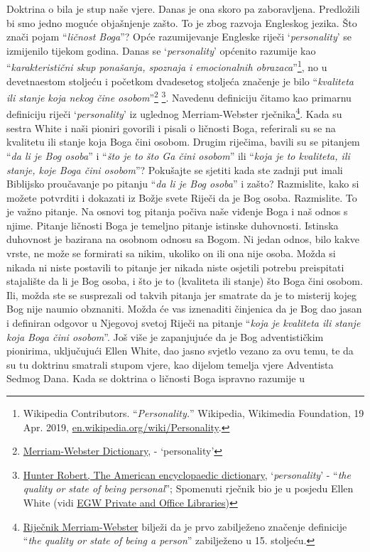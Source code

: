Doktrina o  bila je stup naše vjere. Danas je ona skoro pa zaboravljena. Predložili bi smo jedno moguće objašnjenje zašto. To je zbog razvoja Engleskog jezika. Što znači pojam “\textit{ličnost Boga}”? Opće razumijevanje Engleske riječi ‘\textit{personality}’ se izmijenilo tijekom godina. Danas se ‘\textit{personality}’ općenito razumije kao “\textit{karakteristični skup ponašanja, spoznaja i emocionalnih obrazaca}”\footnote{Wikipedia Contributors. “\textit{Personality.}” Wikipedia, Wikimedia Foundation, 19 Apr. 2019, \href{https://en.wikipedia.org/wiki/Personality}{en.wikipedia.org/wiki/Personality}.}, no u devetnaestom stoljeću i početkom dvadesetog stoljeća značenje je bilo “\textit{kvaliteta ili stanje koja nekog čine osobom}”\footnote{\href{https://www.merriam-webster.com/dictionary/personality}{Merriam-Webster Dictionary}, - ‘personality’} \footnote{\href{https://babel.hathitrust.org/cgi/pt?id=mdp.39015050663213&view=1up&seq=780}{Hunter Robert, The American encyclopaedic dictionary}, ‘\textit{personality}’ - “\textit{the quality or state of being personal}”; Spomenuti rječnik bio je u posjedu Ellen White (vidi \href{https://repo.adventistdigitallibrary.org/PDFs/adl-22/adl-22251050.pdf?_ga=2.116010630.1065317374.1621993520-1506151612.1617862694&fbclid=IwAR3vwmp8jxtnpPEKv0KD9mCv8dJpmRGoyIXW0CkbQAjbU0h6YaBGqhgBzbk}{EGW Private and Office Libraries})}. Navedenu definiciju čitamo kao primarnu definiciju riječi ‘\textit{personality}’ iz uglednog Merriam-Webster rječnika\footnote{\href{https://www.merriam-webster.com/dictionary/personality\#word-history}{Riječnik Merriam-Webster} bilježi da je prvo zabilježeno značenje definicije “\textit{the quality or state of being a person}” zabilježeno u 15. stoljeću.}. Kada su sestra White i naši pioniri govorili i pisali o ličnosti Boga, referirali su se na kvalitetu ili stanje koja Boga čini osobom. Drugim riječima, bavili su se pitanjem “\textit{da li je Bog osoba}” i “\textit{što je to što Ga čini osobom}” ili “\textit{koja je to kvaliteta, ili stanje, koje Boga čini osobom}”? Pokušajte se sjetiti kada ste zadnji put imali Biblijsko proučavanje po pitanju “\textit{da li je Bog osoba}” i zašto? Razmislite, kako si možete potvrditi i dokazati iz Božje svete Riječi da je Bog osoba. Razmislite. To je važno pitanje. Na osnovi tog pitanja počiva naše viđenje Boga i naš odnos s njime. Pitanje ličnosti Boga je temeljno pitanje istinske duhovnosti. Istinska duhovnost je bazirana na osobnom odnosu sa Bogom. Ni jedan odnos, bilo kakve vrste, ne može se formirati sa nikim, ukoliko on ili ona nije osoba. Možda si nikada ni niste postavili to pitanje jer nikada niste osjetili potrebu preispitati stajalište da li je Bog osoba, i što je to (kvaliteta ili stanje) što Boga čini osobom. Ili, možda ste se susprezali od takvih pitanja jer smatrate da je to misterij kojeg Bog nije naumio obznaniti. Možda će vas iznenaditi činjenica da je Bog dao jasan i definiran odgovor u Njegovoj svetoj Riječi na pitanje “\textit{koja je kvaliteta ili stanje koja Boga čini osobom}”. Još više je zapanjujuće da je Bog adventističkim pionirima, uključujući Ellen White, dao jasno svjetlo vezano za ovu temu, te da su tu doktrinu smatrali stupom vjere, kao dijelom temelja vjere Adventista Sedmog Dana. Kada se doktrina o ličnosti Boga ispravno razumije u 